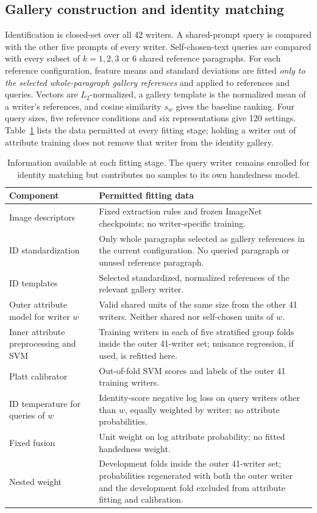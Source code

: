 \subsection{Gallery construction and identity matching}
Identification is closed-set over all 42 writers. A shared-prompt query is compared with the other five prompts of every writer. Self-chosen-text queries are compared with every subset of $k=1,2,3$ or 6 shared reference paragraphs. For each reference configuration, feature means and standard deviations are fitted \emph{only to the selected whole-paragraph gallery references} and applied to references and queries. Vectors are $L_2$-normalized, a gallery template is the normalized mean of a writer's references, and cosine similarity $s_w$ gives the baseline ranking. Four query sizes, five reference conditions and six representations give 120 settings. Table~\ref{tab:mainnesting} lists the data permitted at every fitting stage; holding a writer out of attribute training does not remove that writer from the identity gallery.

\begin{table}[!t]
\caption{Information available at each fitting stage. The query writer remains enrolled for identity matching but contributes no samples to its own handedness model.}\label{tab:mainnesting}
\centering\small
\begin{tabularx}{\textwidth}{>{\raggedright\arraybackslash}p{}>{\raggedright\arraybackslash}X}\toprule
Component & Permitted fitting data\\\midrule
Image descriptors & Fixed extraction rules and frozen ImageNet checkpoints; no writer-specific training.\\
ID standardization & Only whole paragraphs selected as gallery references in the current configuration. No queried paragraph or unused reference paragraph.\\
ID templates & Selected standardized, normalized references of the relevant gallery writer.\\
Outer attribute model for writer $w$ & Valid shared units of the same size from the other 41 writers. Neither shared nor self-chosen units of $w$.\\
Inner attribute preprocessing and SVM & Training writers in each of five stratified group folds inside the outer 41-writer set; nuisance regression, if used, is refitted here.\\
Platt calibrator & Out-of-fold SVM scores and labels of the outer 41 training writers.\\
ID temperature for queries of $w$ & Identity-score negative log loss on query writers other than $w$, equally weighted by writer; no attribute probabilities.\\
Fixed fusion & Unit weight on log attribute probability; no fitted handedness weight.\\
Nested weight & Development folds inside the outer 41-writer set; probabilities regenerated with both the outer writer and the development fold excluded from attribute fitting and calibration.\\\bottomrule
\end{tabularx}
\end{table}

